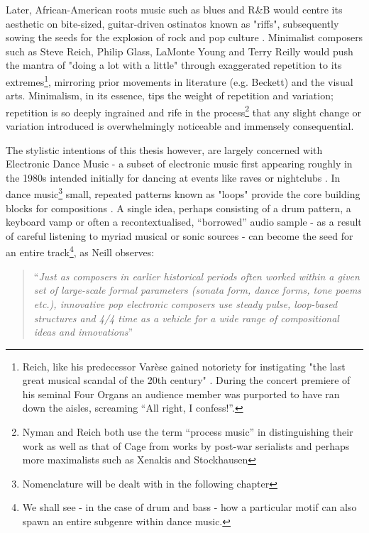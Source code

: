 Later, African-American roots music such as blues and R\&B would centre its aesthetic on bite-sized, guitar-driven ostinatos known as "riffs", subsequently sowing the seeds for the explosion of rock and pop culture \citep{Middleton2009, Hatch1987}. Minimalist composers such as Steve Reich, Philip Glass, LaMonte Young and Terry Reilly \citep{Reich2011, Nyman1999} would push the mantra of "doing a lot with a little" through exaggerated repetition to its extremes\footnote{Reich, like his predecessor Varèse gained notoriety for instigating "the last great musical scandal of the 20th century" \citep{ross2007rest}. During the concert premiere of his seminal Four Organs an audience member was purported to have ran down the aisles, screaming “All right, I confess!”.}, mirroring prior movements in literature (e.g. Beckett) and the visual arts. Minimalism, in its essence, tips the weight of repetition and variation; repetition is so deeply ingrained and rife in the process\footnote{Nyman and Reich both use the term ``process music'' in distinguishing their work as well as that of Cage from works by post-war serialists and perhaps more maximalists such as Xenakis and Stockhausen} that any slight change or variation introduced is overwhelmingly noticeable and immensely consequential.

The stylistic intentions of this thesis however, are largely concerned with Electronic Dance Music - a subset of electronic music first appearing roughly in the 1980s intended initially for dancing at events like raves or nightclubs \citep{McLeod2001, Butler2006}. In dance music\footnote{Nomenclature will be dealt with in the following chapter} small, repeated patterns known as "loops" provide the core building blocks for compositions
	\citep{Neill2002, Patricio2016}. A single idea, perhaps consisting of a drum pattern, a keyboard vamp or often a recontextualised, “borrowed” audio sample - as a result of careful listening to myriad musical or sonic sources - can become the seed for an entire track\footnote{We shall see - in the case of drum and bass - how a particular motif can also spawn an entire subgenre within dance music.}, as Neill observes:
	
\blockcquote[]{Neill2002}{``\textit{Just as composers in earlier historical periods often worked within a given set of large-scale formal parameters (sonata form, dance forms, tone poems etc.), innovative pop electronic composers use steady pulse, loop-based structures and 4/4 time as a vehicle for a wide range of compositional ideas and innovations}''}	
	
